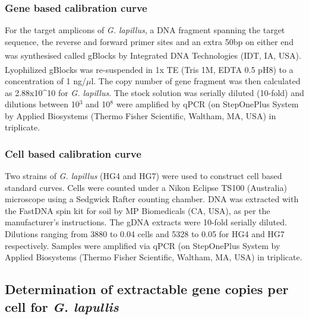 \documentclass[12pt]{article}
\begin{document}
\subsubsection*{Gene based calibration curve}
For the target amplicons of \emph{G. lapillus}, a DNA fragment spanning the target sequence, the reverse and forward primer sites and an extra 50bp on either end was synthesised called gBlocks \textsuperscript{\textregistered} by Integrated DNA Technologies (IDT, IA, USA). %
Lyophilized gBlocks \textsuperscript{\textregistered} was re-suspended in 1x TE (Tris 1M, EDTA 0.5 pH8) to a concentration of 1 ng/$\mu$l. 
The copy number of gene fragment was then calculated as 2.88x10^{10} 
for \textit{G. lapillus}. 
The stock solution was serially diluted (10-fold) and dilutions between 10$^{3}$ and 10$^{8}$ were amplified by qPCR 
(on StepOnePlus System by Applied Biosystems (Thermo Fisher Scientific, Waltham, MA, USA) in triplicate.


\subsubsection*{Cell based calibration curve}
Two strains of \emph{G. lapillus} (HG4 and HG7) 
were used to construct cell based standard curves. 
Cells were counted under a Nikon Eclipse TS100 (Australia) microscope using a Sedgwick Rafter counting chamber. 
DNA was extracted with the FastDNA spin kit for soil by MP Biomedicals (CA, USA), as per the manufacturer's instructions. 
The gDNA extracts were 10-fold serially diluted. 
Dilutions ranging from 3880 to 0.04 cells and 5328 to 0.05 for HG4 and HG7 respectively.  
Samples were amplified via qPCR (on StepOnePlus System by Applied Biosystems (Thermo Fisher Scientific, Waltham, MA, USA) %
in triplicate.

\subsection*{Determination of extractable gene copies per cell for \emph{G. lapullis}}%
\end{document}
